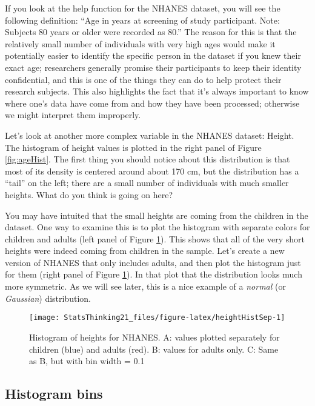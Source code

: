 \documentclass[]{book}
\theoremstyle{definition}
\theoremstyle{definition}
\theoremstyle{definition}
\theoremstyle{remark}
\begin{document}
If you look at the help function for the NHANES dataset, you will see
the following definition: ``Age in years at screening of study
participant. Note: Subjects 80 years or older were recorded as 80.'' The
reason for this is that the relatively small number of individuals with
very high ages would make it potentially easier to identify the specific
person in the dataset if you knew their exact age; researchers generally
promise their participants to keep their identity confidential, and this
is one of the things they can do to help protect their research
subjects. This also highlights the fact that it's always important to
know where one's data have come from and how they have been processed;
otherwise we might interpret them improperly.

Let's look at another more complex variable in the NHANES dataset:
Height. The histogram of height values is plotted in the right panel of
Figure \ref{fig:ageHist}. The first thing you should notice about this
distribution is that most of its density is centered around about 170
cm, but the distribution has a ``tail'' on the left; there are a small
number of individuals with much smaller heights. What do you think is
going on here?

You may have intuited that the small heights are coming from the
children in the dataset. One way to examine this is to plot the
histogram with separate colors for children and adults (left panel of
Figure \ref{fig:heightHistSep}). This shows that all of the very short
heights were indeed coming from children in the sample. Let's create a
new version of NHANES that only includes adults, and then plot the
histogram just for them (right panel of Figure \ref{fig:heightHistSep}).
In that plot that the distribution looks much more symmetric. As we will
see later, this is a nice example of a \emph{normal} (or
\emph{Gaussian}) distribution.

\begin{figure}
\texttt{[image: StatsThinking21\_files/figure-latex/heightHistSep-1]} \caption{Histogram of heights for NHANES. A: values plotted separately for children (blue) and adults (red).  B: values for adults only. C: Same as B, but with bin width = 0.1}\label{fig:heightHistSep}
\end{figure}

\subsection{Histogram bins}\label{histogram-bins}
\end{document}
